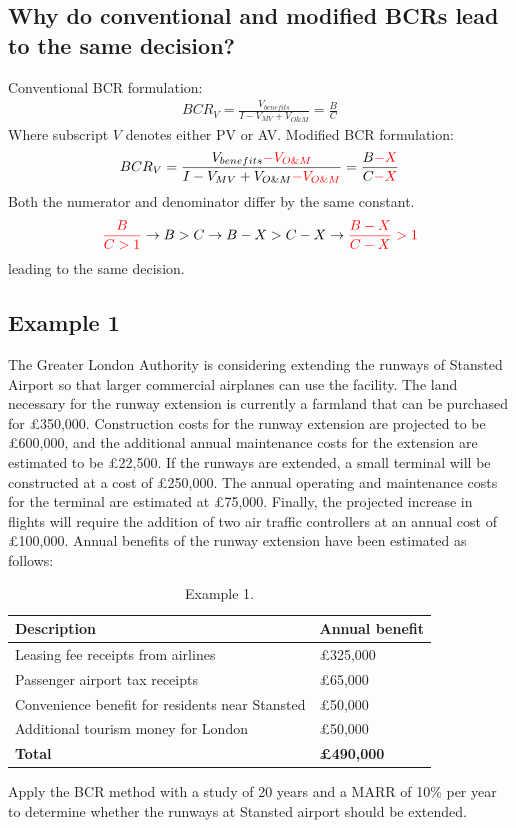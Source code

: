 \subsection{Why do conventional and modified BCRs lead to the same decision?}
Conventional BCR formulation:
\begin{gather}
  BCR_V = \frac{V_{benefits}}{I - V_{MV}+V_{O\& M}} = \frac{B}{C}
\end{gather}
Where subscript $V$ denotes either PV or AV. Modified BCR formulation:
\begin{gather}
  BCR_V = \frac{V_{benefits} \textcolor{red}{-V_{O\&M}}}{I - V_{MV} + V_{O\&M} \textcolor{red}{-V_{O\&M}}} = \frac{B\textcolor{red}{-X}}{C\textcolor{red}{-X}}
\end{gather}
Both the numerator and denominator differ by the same constant.
\begin{gather}
  \textcolor{red}{\frac{B}{C>1}}\rightarrow B > C \rightarrow B - X > C - X \rightarrow \textcolor{red}{\frac{B-X}{C-X}>1}
\end{gather}
leading to the same decision.
\subsection{Example 1}
The Greater London Authority is considering extending the runways of Stansted Airport so that larger commercial airplanes can use the facility. The land necessary for the runway extension is currently a farmland that can be purchased for \pounds 350,000. Construction costs for the runway extension are projected to be \pounds 600,000, and the additional annual maintenance costs for the extension are estimated to be \pounds 22,500. If the runways are extended, a small terminal will be constructed at a cost of \pounds 250,000. The annual operating and maintenance costs for the terminal are estimated at \pounds 75,000. Finally, the projected increase in flights will require the addition of two air traffic controllers at an annual cost of \pounds 100,000. Annual benefits of the runway extension have been estimated as follows:
\begin{table}
  \centering
  \begin{tabular}{@{}ll@{}}
    \toprule
    \textbf{Description}                            & \textbf{Annual benefit}  \\
    \midrule
    Leasing fee receipts from airlines              & \pounds 325,000          \\
    Passenger airport tax receipts                  & \pounds 65,000           \\
    Convenience benefit for residents near Stansted & \pounds 50,000           \\
    Additional tourism money for London             & \pounds 50,000           \\
    \midrule
    \textbf{Total}                                  & \textbf{\pounds 490,000} \\
    \bottomrule
  \end{tabular}
  \caption{Example 1.}
\end{table}
Apply the BCR method with a study of 20 years and a MARR of 10\% per year to determine whether the runways at Stansted airport should be extended.

